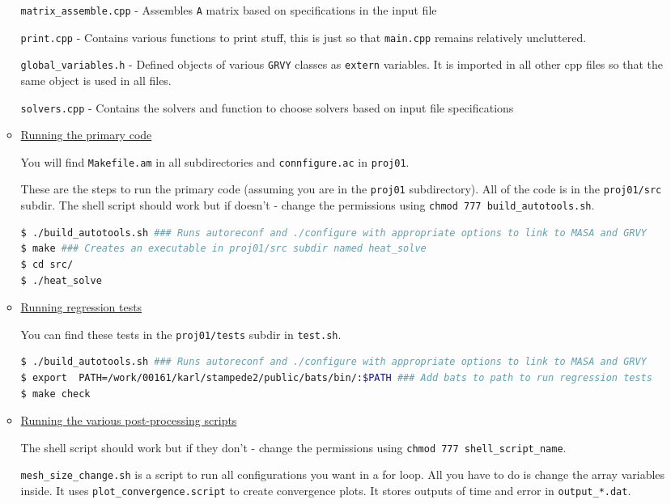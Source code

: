 \documentclass[12 pt, final]{article}
\begin{document}
\begin{itemize}
\begin{itemize}
        \texttt{matrix\_assemble.cpp} - Assembles \texttt{A} matrix based on specifications in the input file
        
        \texttt{print.cpp} - Contains various functions to print stuff, this is just so that \texttt{main.cpp} remains relatively uncluttered.
        
        \texttt{global\_variables.h} - Defined objects of various \texttt{GRVY} classes as \texttt{extern} variables. It is imported in all other cpp files so that the same object is used in all files.
        
        \texttt{solvers.cpp} - Contains the solvers and function to choose solvers based on input file specifications
        \item \underline{Running the primary code}
        
        You will find \texttt{Makefile.am} in all subdirectories and \texttt{connfigure.ac} in \texttt{proj01}.
        
        These are the steps to run the primary code (assuming you are in the \texttt{proj01} subdirectory). All of the code is in the \texttt{proj01/src} subdir. The shell script should work but if doesn't - change the permissions using \texttt{chmod 777 build\_autotools.sh}.
        \begin{lstlisting}[language = bash]
$ ./build_autotools.sh ### Runs autoreconf and ./configure with appropriate options to link to MASA and GRVY
$ make ### Creates an executable in proj01/src subdir named heat_solve
$ cd src/
$ ./heat_solve
        \end{lstlisting}
        \item \underline{Running regression tests}

You can find these tests in the \texttt{proj01/tests} subdir in \texttt{test.sh}.
        \begin{lstlisting}[language = bash]
$ ./build_autotools.sh ### Runs autoreconf and ./configure with appropriate options to link to MASA and GRVY
$ export  PATH=/work/00161/karl/stampede2/public/bats/bin/:$PATH ### Add bats to path to run regression tests
$ make check
        \end{lstlisting}
        \item \underline{Running the various post-processing scripts}
        
        The shell script should work but if they don't - change the permissions using \texttt{chmod 777 shell\_script\_name}.
        
        \texttt{mesh\_size\_change.sh} is a script to run all configurations you want in a for loop. All you have to do is change the array variables inside. It uses \texttt{plot\_convergence.script} to create convergence plots. It stores outputs of time and error in \texttt{output\_*.dat}.
        

\end{itemize}
\end{itemize}
\end{document}
